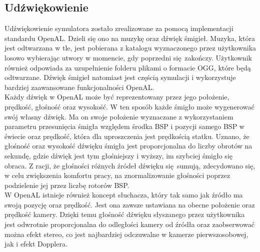 \subsection{Udźwiękowienie}

Udźwiękowienie symulatora zostało zrealizowane za pomocą implementacji standardu OpenAL. Dzieli się ono na muzykę oraz dźwięk śmigieł. Muzyka, która jest odtwarzana w tle, jest pobierana z katalogu wyznaczonego przez użytkownika losowo wybierając utwory w momencie, gdy poprzedni się zakończy. Użytkownik również odpowiada za uzupełnienie folderu plikami o formacie OGG, które będą odtwarzane. Dźwięk śmigieł natomiast jest częścią symulacji i wykorzystuje bardziej zaawansowane funkcjonalności OpenAL. 
\\

Każdy dźwięk w OpenAL może być reprezentowany przez jego położenie, prędkość, głośność oraz wysokość. W ten sposób każde śmigło może wygenerować swój własny dźwięk. Ma on swoje położenie wyznaczane z wykorzystaniem parametru przesunięcia śmigła względem środka BSP i pozycji samego BSP w świecie oraz prędkość, która dla uproszczenia jest prędkością statku. Uznano, że głośność oraz wysokość dźwięku śmigła jest proporcjonalna do liczby obrotów na sekundę, gdzie dźwięk jest tym głośniejszy i wyższy, im szybciej śmigło się obraca. Z racji, że głośności różnych źródeł dźwięku się sumują, zdecydowano się, w celu zwiększenia komfortu pracy, na znormalizowanie głośności poprzez podzielenie jej przez liczbę rotorów BSP. 
\\

W OpenAL istnieje również koncept słuchacza, który tak samo jak źródło ma swoją pozycję oraz prędkość. Jest ona zawsze ustawiana na obecne położenie oraz prędkość kamery. Dzięki temu głośność dźwięku słyszanego przez użytkownika jest odwrotnie proporcjonalna do odległości kamery od źródła oraz zaobserwować można efekt stereo, co jest najbardziej odczuwalne w kamerze pierwszosobowej, jak i efekt Dopplera.
\\